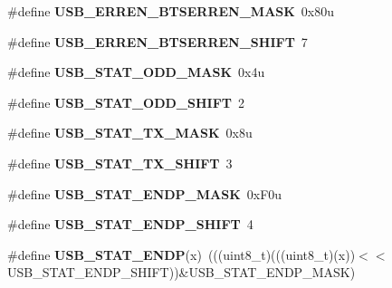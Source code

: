 \begin{DoxyCompactItemize}
\mbox{\label{group___u_s_b___register___masks_ga806a809f05df66a7669733c599646f7f}} 
\#define {\bfseries U\+S\+B\+\_\+\+E\+R\+R\+E\+N\+\_\+\+B\+T\+S\+E\+R\+R\+E\+N\+\_\+\+M\+A\+SK}~0x80u
\item 
\mbox{\label{group___u_s_b___register___masks_ga5e760a100c4f43ecfd71952a5f393d77}} 
\#define {\bfseries U\+S\+B\+\_\+\+E\+R\+R\+E\+N\+\_\+\+B\+T\+S\+E\+R\+R\+E\+N\+\_\+\+S\+H\+I\+FT}~7
\item 
\mbox{\label{group___u_s_b___register___masks_ga49caa3c5b36fc89eadadd60cdf331643}} 
\#define {\bfseries U\+S\+B\+\_\+\+S\+T\+A\+T\+\_\+\+O\+D\+D\+\_\+\+M\+A\+SK}~0x4u
\item 
\mbox{\label{group___u_s_b___register___masks_ga15f3e2fa671ea1a59e0b24a9697faf8a}} 
\#define {\bfseries U\+S\+B\+\_\+\+S\+T\+A\+T\+\_\+\+O\+D\+D\+\_\+\+S\+H\+I\+FT}~2
\item 
\mbox{\label{group___u_s_b___register___masks_gab953f904ef3a2b838a922ebdf69cf140}} 
\#define {\bfseries U\+S\+B\+\_\+\+S\+T\+A\+T\+\_\+\+T\+X\+\_\+\+M\+A\+SK}~0x8u
\item 
\mbox{\label{group___u_s_b___register___masks_ga5173e8423017932d90919ddb18f918bd}} 
\#define {\bfseries U\+S\+B\+\_\+\+S\+T\+A\+T\+\_\+\+T\+X\+\_\+\+S\+H\+I\+FT}~3
\item 
\mbox{\label{group___u_s_b___register___masks_gad8a184e838de511e23aa32011fc9f0b6}} 
\#define {\bfseries U\+S\+B\+\_\+\+S\+T\+A\+T\+\_\+\+E\+N\+D\+P\+\_\+\+M\+A\+SK}~0x\+F0u
\item 
\mbox{\label{group___u_s_b___register___masks_ga5d85a4b028002bc9ce0f1650111cd49a}} 
\#define {\bfseries U\+S\+B\+\_\+\+S\+T\+A\+T\+\_\+\+E\+N\+D\+P\+\_\+\+S\+H\+I\+FT}~4
\item 
\mbox{\label{group___u_s_b___register___masks_ga0302fe6637ae59174d7702947430dbba}} 
\#define {\bfseries U\+S\+B\+\_\+\+S\+T\+A\+T\+\_\+\+E\+N\+DP}(x)~(((uint8\+\_\+t)(((uint8\+\_\+t)(x))$<$$<$U\+S\+B\+\_\+\+S\+T\+A\+T\+\_\+\+E\+N\+D\+P\+\_\+\+S\+H\+I\+FT))\&U\+S\+B\+\_\+\+S\+T\+A\+T\+\_\+\+E\+N\+D\+P\+\_\+\+M\+A\+SK)
$$
\end{DoxyCompactItemize}
